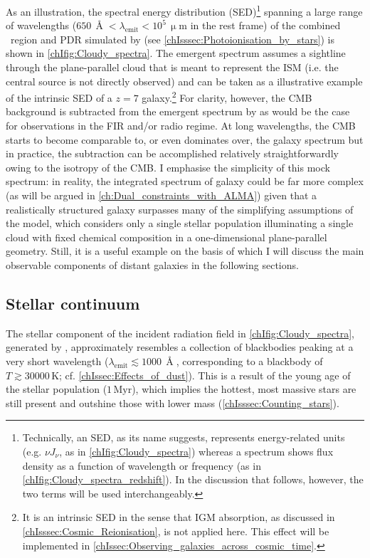 As an illustration, the spectral energy distribution (SED)\footnote{Technically, an SED, as its name suggests, represents energy-related units (e.g. $\nu J_\nu$, as in \cref{chIfig:Cloudy_spectra}) whereas a spectrum shows flux density as a function of wavelength or frequency (as in \cref{chIfig:Cloudy_spectra_redshift}). In the discussion that follows, however, the two terms will be used interchangeably.} spanning a large range of wavelengths ($650 \, \Angstrom < \lambda_\text{emit} < 10^5 \, \mathrm{\upmu m}$ in the rest frame) of the combined \HII\ region and PDR simulated by  (see \cref{chIsssec:Photoionisation_by_stars}) is shown in \cref{chIfig:Cloudy_spectra}. The emergent spectrum assumes a sightline through the plane-parallel cloud that is meant to represent the ISM (i.e. the central source is not directly observed) and can be taken as a illustrative example of the intrinsic SED of a $z = 7$ galaxy.\footnote{It is an intrinsic SED in the sense that IGM absorption, as discussed in \cref{chIsssec:Cosmic_Reionisation}, is not applied here. This effect will be implemented in \cref{chIssec:Observing_galaxies_across_cosmic_time}.} For clarity, however, the CMB background is subtracted from the emergent spectrum by  as would be the case for observations in the FIR and/or radio regime. At long wavelengths, the CMB starts to become comparable to, or even dominates over, the galaxy spectrum but in practice, the subtraction can be accomplished relatively straightforwardly owing to the isotropy of the CMB. I emphasise the simplicity of this mock spectrum: in reality, the integrated spectrum of galaxy could be far more complex (as will be argued in \cref{ch:Dual_constraints_with_ALMA}) given that a realistically structured galaxy surpasses many of the simplifying assumptions of the model, which considers only a single stellar population illuminating a single cloud with fixed chemical composition in a one-dimensional plane-parallel geometry. Still, it is a useful example on the basis of which I will discuss the main observable components of distant galaxies in the following sections.

\subsection{Stellar continuum}
\label{chIssec:Stellar_continuum}

The stellar component of the incident radiation field in \cref{chIfig:Cloudy_spectra}, generated by , approximately resembles a collection of blackbodies peaking at a very short wavelength ($\lambda_\text{emit} \lesssim 1000 \, \Angstrom$, corresponding to a blackbody of $T \gtrsim \num{30000} \, \mathrm{K}$; cf. \cref{chIssec:Effects_of_dust}). This is a result of the young age of the stellar population ($1 \, \mathrm{Myr}$), which implies the hottest, most massive stars are still present and outshine those with lower mass (\cref{chIsssec:Counting_stars}).


